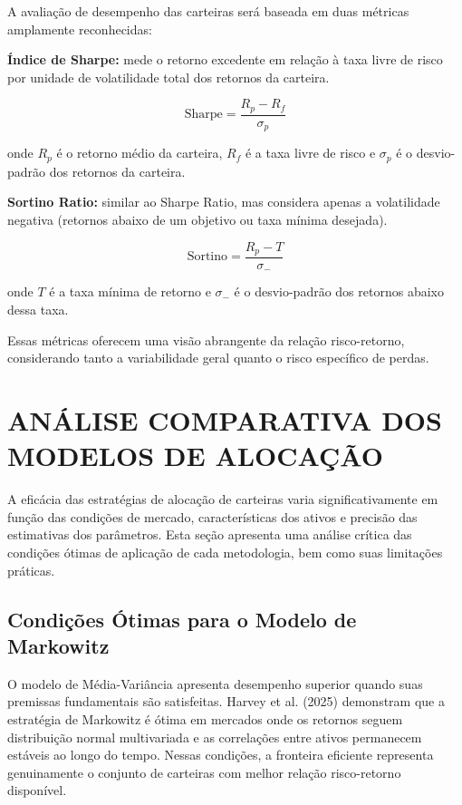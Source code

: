 A avaliação de desempenho das carteiras será baseada em duas métricas amplamente reconhecidas:

\textbf{Índice de Sharpe:} mede o retorno excedente em relação à taxa livre de risco por unidade de volatilidade total dos retornos da carteira.

\begin{equation}
\label{eq:sharpe_ratio}
\text{Sharpe} = \frac{R_p - R_f}{\sigma_p}
\end{equation}

onde $R_p$ é o retorno médio da carteira, $R_f$ é a taxa livre de risco e $\sigma_p$ é o desvio-padrão dos retornos da carteira.

\textbf{Sortino Ratio:} similar ao Sharpe Ratio, mas considera apenas a volatilidade negativa (retornos abaixo de um objetivo ou taxa mínima desejada).

\begin{equation}
\label{eq:sortino_ratio}
\text{Sortino} = \frac{R_p - T}{\sigma_-}
\end{equation}

onde $T$ é a taxa mínima de retorno e $\sigma_-$ é o desvio-padrão dos retornos abaixo dessa taxa.

Essas métricas oferecem uma visão abrangente da relação risco-retorno, considerando tanto a variabilidade geral quanto o risco específico de perdas.

\section{ANÁLISE COMPARATIVA DOS MODELOS DE ALOCAÇÃO}

A eficácia das estratégias de alocação de carteiras varia significativamente em função das condições de mercado, características dos ativos e precisão das estimativas dos parâmetros. Esta seção apresenta uma análise crítica das condições ótimas de aplicação de cada metodologia, bem como suas limitações práticas.

\subsection{Condições Ótimas para o Modelo de Markowitz}

O modelo de Média-Variância apresenta desempenho superior quando suas premissas fundamentais são satisfeitas. Harvey et al. (2025) demonstram que a estratégia de Markowitz é ótima em mercados onde os retornos seguem distribuição normal multivariada e as correlações entre ativos permanecem estáveis ao longo do tempo. Nessas condições, a fronteira eficiente representa genuinamente o conjunto de carteiras com melhor relação risco-retorno disponível.

